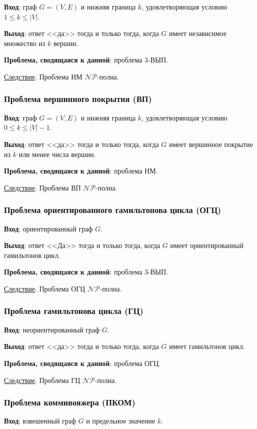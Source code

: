 \textbf{Вход}: граф $G = (V, E)$ и нижняя граница $k$, удовлетворяющая условию $1 \leq k \leq |V|$.

\textbf{Выход}: ответ <<да>> тогда и только тогда, когда $G$ имеет независимое множество из $k$ вершин.

\textbf{Проблема, сводящаяся к данной}: проблема 3-ВЫП.

\underline{Следствие}. Проблема НМ $\mathscr{NP}$-полна.

\subsubsection{Проблема вершинного покрытия (ВП)}
\textbf{Вход}: граф $G = (V, E)$ и нижняя граница $k$, удовлетворяющая условию $0 \leq k \leq |V| - 1$.

\textbf{Выход}: ответ <<да>> тогда и только тогда, когда $G$ имеет вершинное покрытие из $k$ или менее числа вершин.

\textbf{Проблема, сводящаяся к данной}: проблема НМ.

\underline{Следствие}. Проблема ВП $\mathscr{NP}$-полна.

\subsubsection{Проблема ориентированного гамильтонова цикла (ОГЦ)}
\textbf{Вход}: ориентированный граф $G$.

\textbf{Выход}: ответ <<Да>> тогда и только тогда, когда $G$ имеет ориентированный гамильтонов цикл.

\textbf{Проблема, сводящаяся к данной}: проблема 3-ВЫП.

\underline{Следствие}. Проблема ОГЦ $\mathscr{NP}$-полна.

\subsubsection{Проблема гамильтонова цикла (ГЦ)}
\textbf{Вход}: неориентированный граф $G$.

\textbf{Выход}: ответ <<да>> тогда и только тогда, когда $G$ имеет гамильтонов цикл.

\textbf{Проблема, сводящаяся к данной}: проблема ОГЦ.

\underline{Следствие}. Проблема ГЦ $\mathscr{NP}$-полна.

\subsubsection{Проблема коммивояжера (ПКОМ)}
\textbf{Вход}: взвешенный граф $G$ и предельное значение $k$.

